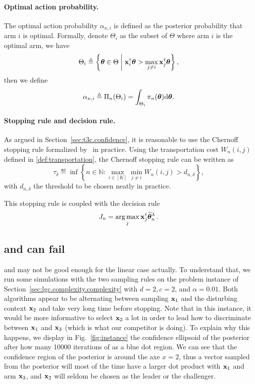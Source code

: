 \paragraph{Optimal action probability.} 
The optimal action probability $\alpha_{n,i}$ is defined as the posterior probability that arm $i$ is optimal. Formally, denote $\Theta_i$ as the subset of $\Theta$ where arm $i$ is the optimal arm, we have
\[
    \Theta_i \triangleq \left\{ {\boldsymbol \theta}\in\Theta \biggm| {\bf x}_i^\mathsf{\scriptscriptstyle T}{\boldsymbol \theta} > \max_{j\neq i}{\bf x}_j^\mathsf{\scriptscriptstyle T}{\boldsymbol \theta} \right\},
\]
then we define
\[
   \alpha_{n,i} \triangleq \Pi_{n}(\Theta_i) = \int_{\Theta_i} \pi_n({\boldsymbol \theta}) \text{d} {\boldsymbol \theta}.
\]

\paragraph{Stopping rule and decision rule.}
As argued in Section~\ref{sec:t3c.confidence}, it is reasonable to use the Chernoff stopping rule formalized by~\cite{garivier2016tracknstop} in practice. Using the transportation cost $W_n(i,j)$ defined in \eqref{def:transportation}, the Chernoff stopping rule can be written as
\begin{equation}\label{eq:lgc.bayesian_stopping}
\tau_\delta \eqdef \inf \left\lbrace n \in \mathbb{N} : \max_{i \in [K]} \min_{j \neq i } W_{n}(i,j) > d_{n,\delta} \right\rbrace,
\end{equation}
with $d_{n,\delta}$ the threshold to be chosen neatly in practice. 

This stopping rule is coupled with the decision rule 
\begin{align}\label{eq:lgc.bayesian_decision}
    J_n = \operatorname*{arg\,max}_{j}{\bf x}_j^\mathsf{\scriptscriptstyle T}\widehat{{\boldsymbol \theta}}_n^{\lambda}\,.
\end{align}

\subsection{\LTCS{} and \LTCC{} can fail}\label{sec:lgc.bayesian.fail}

\LTCS{} and \LTCC{} may not be good enough for the linear case actually. To understand that, we run some simulations with the two sampling rules on the problem instance of Section~\ref{sec:lgc.complexity.complexity} with $d=2, c=2$, and $\alpha=0.01$. Both algorithms appear to be alternating between sampling ${\bf x}_1$ and the disturbing context ${\bf x}_2$ and take very long time before stopping. Note that in this instance, it would be more informative to select ${\bf x}_2$ a lot in order to lead how to discriminate between ${\bf x}_1$ and ${\bf x}_3$ (which is what our competitor \LGapE{} is doing). To explain why this happens, we display in Fig.~\ref{fig:instance} the confidence ellipsoid of the posterior after how many 10000 iterations of \LTCC{} as a blue dot region. We can see that the confidence region of the posterior is around the axe $x=2$, thus a vector sampled from the posterior will most of the time have a larger dot product with ${\bf x}_1$ and arm ${\bf x}_3$, and ${\bf x}_2$ will seldom be chosen as the leader or the challenger. 

